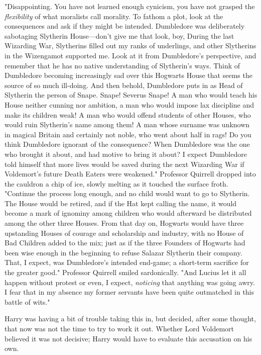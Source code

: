 "Disappointing. You have not learned enough cynicism, you have not grasped the
\emph{flexibility} of what moralists call morality. To fathom a plot, look at
the consequences and ask if they might be intended. Dumbledore was deliberately
sabotaging Slytherin House---don't give me that look, boy,  During the last Wizarding War, Slytherins filled out my ranks of
underlings, and other Slytherins in the Wizengamot supported me. Look at it
from Dumbledore's perspective, and remember that he has no native understanding
of Slytherin's ways. Think of Dumbledore becoming increasingly sad over this
Hogwarts House that seems the source of so much ill-doing. And then behold,
Dumbledore puts in as Head of Slytherin the person of Snape. Snape! Severus
Snape! A man who would teach his House neither cunning nor ambition, a man who
would impose lax discipline and make its children weak! A man who would offend
students of other Houses, who would ruin Slytherin's name among them! A man
whose surname was unknown in magical Britain and certainly not noble, who went
about half in rags! Do you think Dumbledore ignorant of the consequence? When
Dumbledore was the one who brought it about, and had motive to bring it about?
I expect Dumbledore told himself that more lives would be saved during the next
Wizarding War if Voldemort's future Death Eaters were weakened." Professor
Quirrell dropped into the cauldron a chip of ice, slowly melting as it touched
the surface froth. "Continue the process long enough, and no child would want
to go to Slytherin. The House would be retired, and if the Hat kept calling the
name, it would become a mark of ignominy among children who would afterward be
distributed among the other three Houses. From that day on, Hogwarts would have
three upstanding Houses of courage and scholarship and industry, with no House
of Bad Children added to the mix; just as if the three Founders of Hogwarts had
been wise enough in the beginning to refuse Salazar Slytherin their company.
That, I expect, was Dumbledore's intended end-game; a short-term sacrifice for
the greater good." Professor Quirrell smiled sardonically. "And Lucius let it
all happen without protest or even, I expect, \emph{noticing} that anything was
going awry. I fear that in my absence my former servants have been quite
outmatched in this battle of wits."

Harry was having a bit of trouble taking this in, but decided, after some
thought, that now was not the time to try to work it out. Whether Lord
Voldemort believed it was not decisive; Harry would have to evaluate this
accusation on his own.

